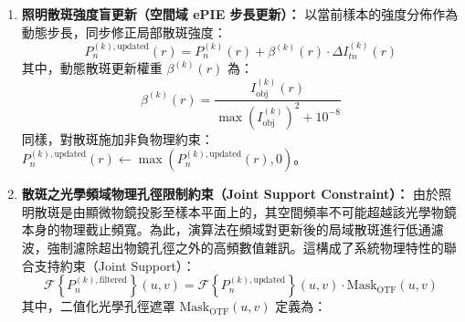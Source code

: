 \begin{enumerate}
    計算修正前與修正後目標強度的空間域殘差：$\Delta I_{tn}^{(k)}(r) = I_{tn}^{(k), \text{updated}}(r) - I_{\text{obj}}^{(k)}(r) \cdot P_n^{(k)}(r)$。
    演算法以局部散斑的能量大小作為動態加權因子，更新樣本強度估計值，以加快收斂速度：
    \begin{equation}
        I_{\text{obj}}^{(k)}(r) \leftarrow I_{\text{obj}}^{(k)}(r) + \alpha^{(k)}(r) \cdot \Delta I_{tn}^{(k)}(r)
    \end{equation}
    其中，動態物體更新權重 $\alpha^{(k)}(r)$ 為：
    \begin{equation}
        \alpha^{(k)}(r) = \frac{P_n^{(k)}(r)}{\max\left(P_n^{(k)}\right)^2 + 10^{-8}}
    \end{equation}
    \textbf{實體非負約束（Non-negativity Constraint）：} 由於螢光強度在物理上不可能為負值，演算法在每次更新後立即強制執行下限截斷，以剔除因高頻數值運算引起的隨機負值噪訊，這能極大增強背景的對比度與暗區的穩定性：
    \begin{equation}
        I_{\text{obj}}^{(k)}(r) \leftarrow \max\left( I_{\text{obj}}^{(k)}(r), 0 \right)
    \end{equation}
    \item \textbf{照明散斑強度盲更新（空間域 ePIE 步長更新）：}
    以當前樣本的強度分佈作為動態步長，同步修正局部散斑強度：
    \begin{equation}
        P_n^{(k), \text{updated}}(r) = P_n^{(k)}(r) + \beta^{(k)}(r) \cdot \Delta I_{tn}^{(k)}(r)
    \end{equation}
    其中，動態散斑更新權重 $\beta^{(k)}(r)$ 為：
    \begin{equation}
        \beta^{(k)}(r) = \frac{I_{\text{obj}}^{(k)}(r)}{\max\left(I_{\text{obj}}^{(k)}\right)^2 + 10^{-8}}
    \end{equation}
    同樣，對散斑施加非負物理約束：$P_n^{(k), \text{updated}}(r) \leftarrow \max(P_n^{(k), \text{updated}}(r), 0)$。
    \item \textbf{散斑之光學頻域物理孔徑限制約束（Joint Support Constraint）：}
    由於照明散斑是由顯微物鏡投影至樣本平面上的，其空間頻率不可能超越該光學物鏡本身的物理截止頻寬。為此，演算法在頻域對更新後的局域散斑進行低通濾波，強制濾除超出物鏡孔徑之外的高頻數值雜訊。這構成了系統物理特性的聯合支持約束（Joint Support）：
    \begin{equation}
        \mathcal{F}\left\{ P_n^{(k), \text{filtered}} \right\}(u, v) = \mathcal{F}\left\{ P_n^{(k), \text{updated}} \right\}(u, v) \cdot \text{Mask}_{\text{OTF}}(u, v)
    \end{equation}
    其中，二值化光學孔徑遮罩 $\text{Mask}_{\text{OTF}}(u, v)$ 定義為：

\end{enumerate}
